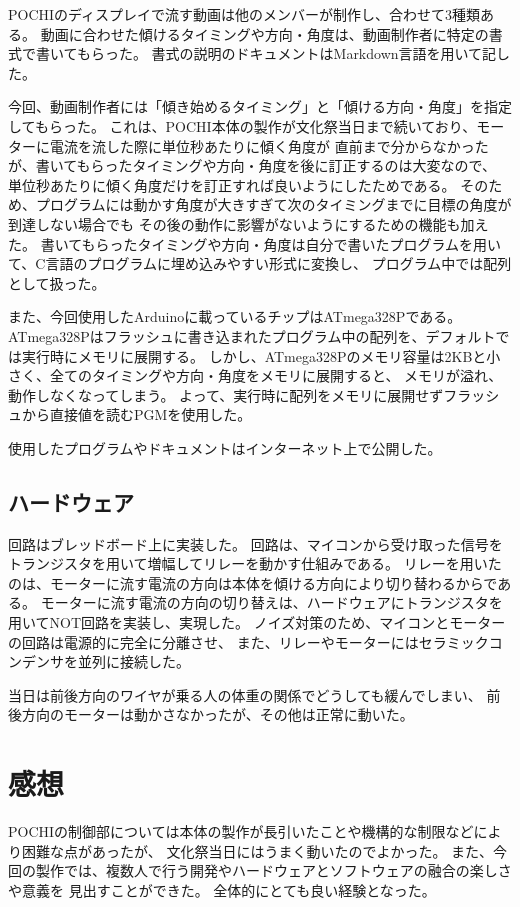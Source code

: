 \documentclass{jsarticle}
\begin{document}
POCHIのディスプレイで流す動画は他のメンバーが制作し、合わせて3種類ある。
動画に合わせた傾けるタイミングや方向・角度は、動画制作者に特定の書式で書いてもらった。
書式の説明のドキュメントはMarkdown言語を用いて記した。

今回、動画制作者には「傾き始めるタイミング」と「傾ける方向・角度」を指定してもらった。
これは、POCHI本体の製作が文化祭当日まで続いており、モーターに電流を流した際に単位秒あたりに傾く角度が
直前まで分からなかったが、書いてもらったタイミングや方向・角度を後に訂正するのは大変なので、
単位秒あたりに傾く角度だけを訂正すれば良いようにしたためである。
そのため、プログラムには動かす角度が大きすぎて次のタイミングまでに目標の角度が到達しない場合でも
その後の動作に影響がないようにするための機能も加えた。
書いてもらったタイミングや方向・角度は自分で書いたプログラムを用いて、C言語のプログラムに埋め込みやすい形式に変換し、
プログラム中では配列として扱った。

また、今回使用したArduinoに載っているチップはATmega328Pである。
ATmega328Pはフラッシュに書き込まれたプログラム中の配列を、デフォルトでは実行時にメモリに展開する。
しかし、ATmega328Pのメモリ容量は2KBと小さく、全てのタイミングや方向・角度をメモリに展開すると、
メモリが溢れ、動作しなくなってしまう。
よって、実行時に配列をメモリに展開せずフラッシュから直接値を読むPGMを使用した。

使用したプログラムやドキュメントはインターネット上で公開した。

\subsection{ハードウェア}
回路はブレッドボード上に実装した。
回路は、マイコンから受け取った信号をトランジスタを用いて増幅してリレーを動かす仕組みである。
リレーを用いたのは、モーターに流す電流の方向は本体を傾ける方向により切り替わるからである。
モーターに流す電流の方向の切り替えは、ハードウェアにトランジスタを用いてNOT回路を実装し、実現した。
ノイズ対策のため、マイコンとモーターの回路は電源的に完全に分離させ、
また、リレーやモーターにはセラミックコンデンサを並列に接続した。

当日は前後方向のワイヤが乗る人の体重の関係でどうしても緩んでしまい、
前後方向のモーターは動かさなかったが、その他は正常に動いた。

\section{感想}
POCHIの制御部については本体の製作が長引いたことや機構的な制限などにより困難な点があったが、
文化祭当日にはうまく動いたのでよかった。
また、今回の製作では、複数人で行う開発やハードウェアとソフトウェアの融合の楽しさや意義を
見出すことができた。
全体的にとても良い経験となった。
\end{document}
